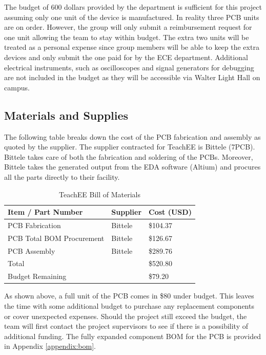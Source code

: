\documentclass[letterpaper,12pt]{article}
\begin{document}
The budget of 600 dollars provided by the department is sufficient for this
project assuming only one unit of the device is manufactured. In reality three
PCB units are on order. However, the group will only submit a reimbursement
request for one unit allowing the team to stay within budget. The extra two
units will be treated as a personal expense since group members will be able to
keep the extra devices and only submit the one paid for by the ECE department.
Additional electrical instruments, such as oscilloscopes and signal generators
for debugging are not included in the budget as they will be accessible via
Walter Light Hall on campus.

\subsection{Materials and Supplies}
The following table breaks down the cost of the PCB fabrication and assembly as
quoted by the supplier. The supplier contracted for TeachEE is Bittele (7PCB).
Bittele takes care of both the fabrication and soldering of the PCBs. Moreover,
Bittele takes the generated output from the EDA software (Altium) and procures
all the parts directly to their facility.

\begin{table}[h!]
    \caption{TeachEE Bill of Materials}
    \begin{tabularx}{\textwidth}{l|l|l}
        \textbf{Item / Part Number} & \textbf{Supplier} & \textbf{Cost (USD)} \\
        \hline
        PCB Fabrication & Bittele & \$104.37\\
        PCB Total BOM Procurement & Bittele & \$126.67\\
        PCB Assembly & Bittele & \$289.76\\
        \hline
        Total & & \$520.80\\
        \hline
        Budget Remaining & & \$79.20
    \end{tabularx} 
\label{tab:abbreviated-bom}
\end{table}

As shown above, a full unit of the PCB comes in \$80 under budget. This leaves
the time with some additional budget to purchase any replacement components or
cover unexpected expenses. Should the project still exceed the budget, the team
will first contact the project supervisors to see if there is a possibility of
additional funding. The fully expanded component BOM for the PCB is provided in
Appendix \ref{appendix:bom}.
\end{document}
